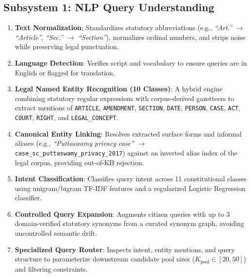 \documentclass[10pt,twocolumn]{article}
\begin{document}
\subsection{Subsystem 1: NLP Query Understanding}
\begin{enumerate}[leftmargin=*]
    \item \textbf{Text Normalization}: Standardizes statutory abbreviations (e.g., \textit{``Art.''} $\to$ \textit{``Article''}, \textit{``Sec.''} $\to$ \textit{``Section''}), normalizes ordinal numbers, and strips noise while preserving legal punctuation.
    \item \textbf{Language Detection}: Verifies script and vocabulary to ensure queries are in English or flagged for translation.
    \item \textbf{Legal Named Entity Recognition (10 Classes)}: A hybrid engine combining statutory regular expressions with corpus-derived gazetteers to extract mentions of \texttt{ARTICLE}, \texttt{AMENDMENT}, \texttt{SECTION}, \texttt{DATE}, \texttt{PERSON}, \texttt{CASE}, \texttt{ACT}, \texttt{COURT}, \texttt{RIGHT}, and \texttt{LEGAL\_CONCEPT}.
    \item \textbf{Canonical Entity Linking}: Resolves extracted surface forms and informal aliases (e.g., \textit{``Puttaswamy privacy case''} $\to$ \texttt{case\_sc\_puttaswamy\_privacy\_2017}) against an inverted alias index of the legal corpus, providing out-of-KB rejection.
    \item \textbf{Intent Classification}: Classifies query intent across 11 constitutional classes using unigram/bigram TF-IDF features and a regularized Logistic Regression classifier.
    \item \textbf{Controlled Query Expansion}: Augments citizen queries with up to 3 domain-verified statutory synonyms from a curated synonym graph, avoiding uncontrolled semantic drift.
    \item \textbf{Specialized Query Router}: Inspects intent, entity mentions, and query structure to parameterize downstream candidate pool sizes ($K_{\text{pool}} \in [20, 50]$) and filtering constraints.
\end{enumerate}
\end{document}
